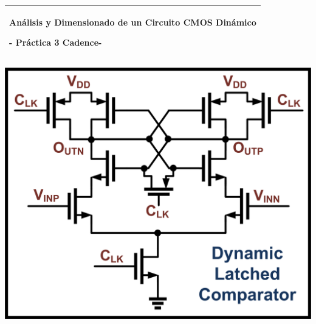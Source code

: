 %
%
%
%
%
\begin{titlepage}
  \addtolength{\hoffset}{0.5\evensidemargin-0.5\oddsidemargin} %
  \noindent%
  \begin{tabular}{@{}p{\textwidth}@{}}
    \toprule[2pt]
    \midrule
    \vspace{0.2cm}
    \begin{center}
    \Huge{\textbf{
      Análisis y Dimensionado de un Circuito CMOS Dinámico%
    }}
    \end{center}
    \begin{center}
      \Large{
        - Práctica 3 Cadence-%
      }
    \end{center}
    \vspace{0.2cm}\\
    \midrule
    \toprule[2pt]
  \end{tabular}
  \vspace{1 cm}
  \begin{center}
  \includegraphics[scale = 1.8]{figures/Portada.png}

\end{center}
\end{titlepage}
